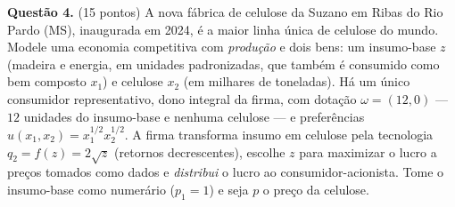 
\textbf{Questão 4.} (15 pontos) A nova fábrica de celulose da Suzano em Ribas do Rio Pardo (MS), inaugurada em 2024, é a maior linha única de celulose do mundo. Modele uma economia competitiva com \emph{produção} e dois bens: um insumo-base $z$ (madeira e energia, em unidades padronizadas, que também é consumido como bem composto $x_1$) e celulose $x_2$ (em milhares de toneladas). Há um único consumidor representativo, dono integral da firma, com dotação $\omega=(12,0)$ --- $12$ unidades do insumo-base e nenhuma celulose --- e preferências $u(x_1,x_2)=x_1^{1/2}x_2^{1/2}$. A firma transforma insumo em celulose pela tecnologia $q_2=f(z)=2\sqrt{z}$ (retornos decrescentes), escolhe $z$ para maximizar o lucro a preços tomados como dados e \emph{distribui} o lucro ao consumidor-acionista. Tome o insumo-base como numerário ($p_1=1$) e seja $p$ o preço da celulose.

